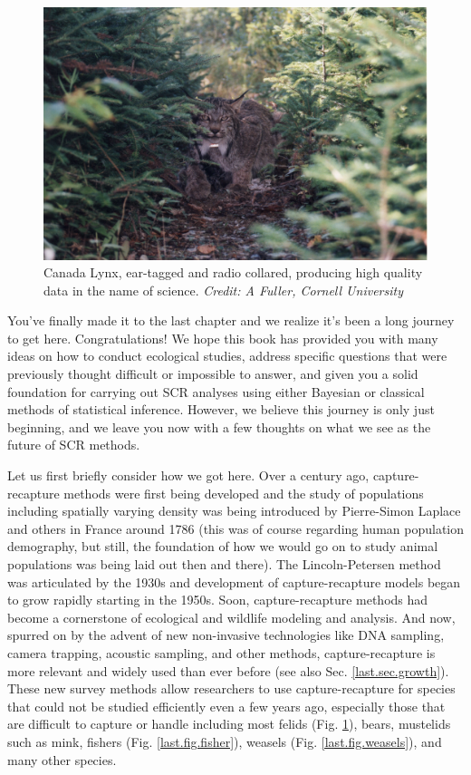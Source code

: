 \begin{figure}[h!]
\centering
\includegraphics[width=\textwidth]{Ch20-Last/lynx.jpg}
\caption{
Canada Lynx, ear-tagged and radio collared, producing high quality
data in the name of science.
{\it Credit: A Fuller, Cornell University} }
\label{last.fig.lynx}
\end{figure}

You've finally made it to the last chapter and we realize it's been a
long journey to get here. Congratulations! %
We hope this book has provided you with many ideas on how to conduct
ecological studies, address specific questions that were previously
thought difficult or impossible to answer, and given you a solid
foundation for carrying out SCR analyses
using either Bayesian or classical methods of statistical inference.
However, we believe this journey is only just beginning, and we leave
you now with a few thoughts on what we see as the future of SCR
methods.

Let us first briefly consider how we got here. Over a century ago,
capture-recapture methods were first being developed and the study of
populations including spatially varying density was being introduced
by Pierre-Simon Laplace and others in France around 1786 (this was of
course regarding human population demography, but still, the
foundation of how we would go on to study animal populations was being
laid out then and there).  The Lincoln-Petersen method was articulated
by
the 1930s and development of capture-recapture models began to grow
rapidly %
starting in the 1950s.  Soon, capture-recapture methods had become a
cornerstone of ecological and wildlife modeling and analysis. And now,
spurred on by the advent of new non-invasive technologies like DNA
sampling, camera trapping, acoustic sampling, and other methods,
capture-recapture is more relevant and widely used than ever before
(see also Sec. \ref{last.sec.growth}). These new survey methods allow
researchers to use capture-recapture for species that could not be
studied efficiently even a few years ago, especially those that are
difficult to capture or handle including most felids
(Fig. \ref{last.fig.lynx}), bears,
mustelids such as
mink,
fishers (Fig. \ref{last.fig.fisher}), 
 weasels (Fig. \ref{last.fig.weasels}), 
and many other species.

